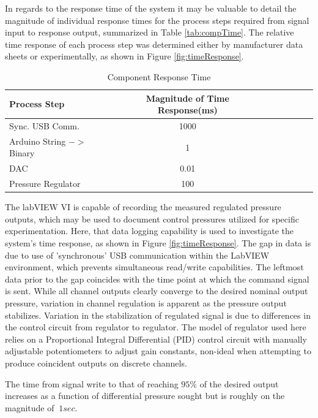 In regards to the response time of the system it may be valuable to detail the magnitude of individual response times for the process steps required from signal input to response output, summarized in Table \vref{tab:compTime}. The relative time response of each process step was determined either by manufacturer data sheets or experimentally, as shown in Figure \vref{fig:timeResponse}.

\begin{table}[H]
\begin{center}
\begin{tabular}{l*{6}{c}r}
Process Step & Magnitude of Time Response(ms) \\
\hline
Sync. USB Comm. & 1000 \\
Arduino String $->$ Binary & 1 \\
DAC & 0.01\\
Pressure Regulator & 100\\
\end{tabular}
\caption [Component Response Time]{Component Response Time} 
\label{tab:compTime}
\end{center}
\end{table}

The labVIEW VI is capable of recording the measured regulated pressure outputs, which may be used to document control pressures utilized for specific experimentation. Here, that data logging capability is used to investigate the system's time response, as shown in Figure \vref{fig:timeResponse}. The gap in data is due to use of 'synchronous' USB communication within the LabVIEW environment, which prevents simultaneous read/write capabilities. The leftmost data prior to the gap coincides with the time point at which the command signal is sent. While all channel outputs clearly converge to the desired nominal output pressure, variation in channel regulation is apparent as the pressure output stabilizes. Variation in the stabilization of regulated signal is due to differences in the control circuit from regulator to regulator. The model of regulator used here relies on a Proportional Integral Differential (PID) control circuit with manually adjustable potentiometers to adjust gain constants, non-ideal when attempting to produce coincident outputs on discrete channels.

The time from signal write to that of reaching $95\%$ of the desired output increases as a function of differential pressure sought but is roughly on the magnitude of $~1 sec$. 

